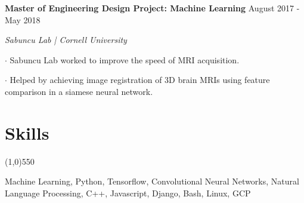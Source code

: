 \documentclass[11pt]{article} %
\begin{document}
    \vspace{+3ex}
    \textbf{\large Master of Engineering Design Project: Machine Learning} \hfill August 2017 - May 2018 \vspace{-0ex}
	\setlength{\parindent}{-0ex} \par
		\textit{Sabuncu Lab | Cornell University}\vspace{+2ex} \par
		$\boldsymbol{\cdot}$ Sabuncu Lab worked to improve the speed of MRI acquisition. \par \vspace{+1ex}
		$\boldsymbol{\cdot}$ Helped by achieving image registration of 3D brain MRIs using feature comparison in a siamese neural network. \par \vspace{+3ex}
	\setlength{\itemindent}{0in}


	\section*{Skills}
	\vspace{-7ex}
	\begin{center}
    \line(1,0){550}
    \end{center}
    Machine Learning, Python, Tensorflow, Convolutional Neural Networks, Natural Language Processing, C++, Javascript, Django, Bash, Linux, GCP 

	\vspace{+1ex}
\end{document}
